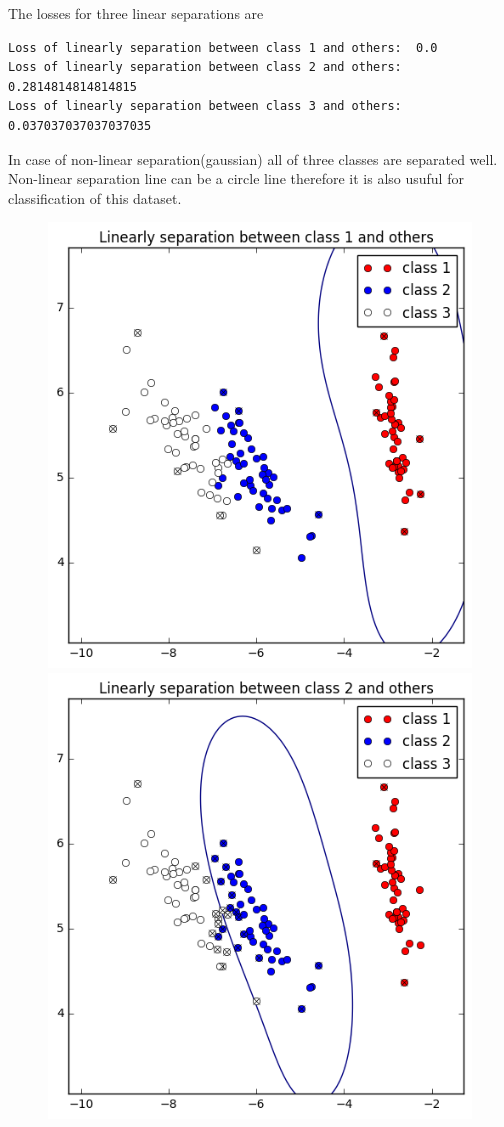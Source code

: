 \documentclass[a4paper,11pt]{article}
\begin{document}
The losses for three linear separations are

\begin{verbatim}
Loss of linearly separation between class 1 and others:  0.0
Loss of linearly separation between class 2 and others:  0.2814814814814815
Loss of linearly separation between class 3 and others:  0.037037037037037035
\end{verbatim}

In case of non-linear separation(gaussian) all of three classes are separated well. Non-linear separation line can be a circle line therefore it is also usuful for classification of this dataset.

\begin{figure}[htbp]
  \includegraphics[scale=0.3]{nl1_23.png}
  \includegraphics[scale=0.3]{nl2_13.png}

\end{figure}
\end{document}
